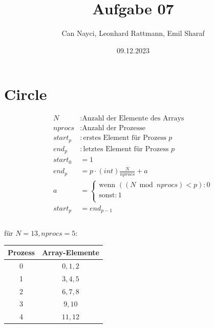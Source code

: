 \documentclass[a4paper,10pt]{article}
\title{Aufgabe 07}
\author{Can Nayci, Leonhard Rattmann, Emil Sharaf}
\date{09.12.2023}
\begin{document}
\maketitle

\section{Circle}
\begin{align*}
 N &: \text{Anzahl der Elemente des Arrays} \\
 nprocs &: \text{Anzahl der Prozesse} \\
 start_p &: \text{erstes Element für Prozess } p\\
 end_p &: \text{letztes Element für Prozess } p\\
 start_0 &= 1 \\
 end_p &= p \cdot (int) \frac{N}{nprocs} + a\\
 a &=
 \begin{cases}
    \text{wenn }((N \bmod nprocs) < p) : 0\\
    \text{sonst} : 1\\
 \end{cases}\\
 start_p &= end_{p-1}\\
\end{align*}\\
für $N = 13, nprocs = 5$:
\begin{tabular}{c | c}
 Prozess & Array-Elemente \\
 \hline
 0 & $0,1,2$\\
 1 & $3,4,5$\\
 2 & $6,7,8$\\
 3 & $9,10$\\
 4 & $11,12$\\
\end{tabular}


\end{document}
